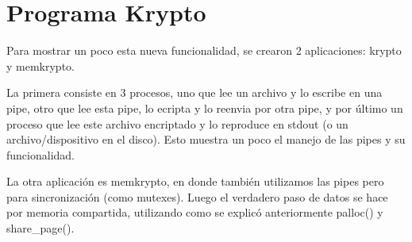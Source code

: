 \section{Programa Krypto}

Para mostrar un poco esta nueva funcionalidad, se crearon 2 aplicaciones:
krypto y memkrypto.

La primera consiste en 3 procesos, uno que lee un archivo y lo escribe en una
pipe, otro que lee esta pipe, lo ecripta y lo reenvia por otra pipe, y por
último un proceso que lee este archivo encriptado y lo reproduce en stdout (o
un archivo/dispositivo en el disco). Esto muestra un poco el manejo de las
pipes y su funcionalidad.

La otra aplicación es memkrypto, en donde también utilizamos las pipes pero
para sincronización (como mutexes). Luego el verdadero paso de datos se hace
por memoria compartida, utilizando como se explicó anteriormente palloc() y
share\_page().
